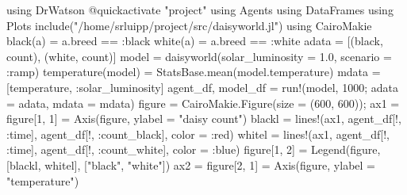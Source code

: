 \documentclass[
  english,
  russian,
  12pt,
  a4paper,
  DIV=11,
  numbers=noendperiod]{scrreprt}
\newenvironment{Shaded}{\begin{snugshade}}{\end{snugshade}}
\newcommand{\BuiltInTok}[1]{\textcolor[rgb]{0.00,0.23,0.31}{#1}}
\newcommand{\FloatTok}[1]{\textcolor[rgb]{0.68,0.00,0.00}{#1}}
\newcommand{\FunctionTok}[1]{\textcolor[rgb]{0.28,0.35,0.67}{#1}}
\newcommand{\ImportTok}[1]{\textcolor[rgb]{0.00,0.46,0.62}{#1}}
\newcommand{\NormalTok}[1]{\textcolor[rgb]{0.00,0.23,0.31}{#1}}
\newcommand{\OperatorTok}[1]{\textcolor[rgb]{0.37,0.37,0.37}{#1}}
\newcommand{\PreprocessorTok}[1]{\textcolor[rgb]{0.68,0.00,0.00}{#1}}
\newcommand{\StringTok}[1]{\textcolor[rgb]{0.13,0.47,0.30}{#1}}
\begin{document}
\begin{Shaded}
\begin{Highlighting}[]
\ImportTok{using} \BuiltInTok{DrWatson}
\PreprocessorTok{@quickactivate} \StringTok{"project"}
\ImportTok{using} \BuiltInTok{Agents}
\ImportTok{using} \BuiltInTok{DataFrames}
\ImportTok{using} \BuiltInTok{Plots}
\FunctionTok{include}\NormalTok{(}\StringTok{"/home/srluipp/project/src/daisyworld.jl"}\NormalTok{)}
\ImportTok{using} \BuiltInTok{CairoMakie}
\FunctionTok{black}\NormalTok{(a) }\OperatorTok{=}\NormalTok{ a.breed }\OperatorTok{==} \OperatorTok{:}\NormalTok{black}
\FunctionTok{white}\NormalTok{(a) }\OperatorTok{=}\NormalTok{ a.breed }\OperatorTok{==} \OperatorTok{:}\NormalTok{white}
\NormalTok{adata }\OperatorTok{=}\NormalTok{ [(black, count), (white, count)]}
\NormalTok{model }\OperatorTok{=} \FunctionTok{daisyworld}\NormalTok{(solar\_luminosity }\OperatorTok{=} \FloatTok{1.0}\NormalTok{, scenario }\OperatorTok{=} \OperatorTok{:}\NormalTok{ramp)}
\FunctionTok{temperature}\NormalTok{(model) }\OperatorTok{=}\NormalTok{ StatsBase.}\FunctionTok{mean}\NormalTok{(model.temperature)}
\NormalTok{mdata }\OperatorTok{=}\NormalTok{ [temperature, }\OperatorTok{:}\NormalTok{solar\_luminosity]}
\NormalTok{agent\_df, model\_df }\OperatorTok{=} \FunctionTok{run!}\NormalTok{(model, }\FloatTok{1000}\NormalTok{; adata }\OperatorTok{=}\NormalTok{ adata, mdata }\OperatorTok{=}\NormalTok{ mdata)}
\NormalTok{figure }\OperatorTok{=}\NormalTok{ CairoMakie.}\FunctionTok{Figure}\NormalTok{(size }\OperatorTok{=}\NormalTok{ (}\FloatTok{600}\NormalTok{, }\FloatTok{600}\NormalTok{));}
\NormalTok{ax1 }\OperatorTok{=}\NormalTok{ figure[}\FloatTok{1}\NormalTok{, }\FloatTok{1}\NormalTok{] }\OperatorTok{=} \FunctionTok{Axis}\NormalTok{(figure, ylabel }\OperatorTok{=} \StringTok{"daisy count"}\NormalTok{)}
\NormalTok{blackl }\OperatorTok{=} \FunctionTok{lines!}\NormalTok{(ax1, agent\_df[!, }\OperatorTok{:}\NormalTok{time], agent\_df[!, }\OperatorTok{:}\NormalTok{count\_black], color }\OperatorTok{=} \OperatorTok{:}\NormalTok{red)}
\NormalTok{whitel }\OperatorTok{=} \FunctionTok{lines!}\NormalTok{(ax1, agent\_df[!, }\OperatorTok{:}\NormalTok{time], agent\_df[!, }\OperatorTok{:}\NormalTok{count\_white], color }\OperatorTok{=} \OperatorTok{:}\NormalTok{blue)}
\NormalTok{figure[}\FloatTok{1}\NormalTok{, }\FloatTok{2}\NormalTok{] }\OperatorTok{=} \FunctionTok{Legend}\NormalTok{(figure, [blackl, whitel], [}\StringTok{"black"}\NormalTok{, }\StringTok{"white"}\NormalTok{])}
\NormalTok{ax2 }\OperatorTok{=}\NormalTok{ figure[}\FloatTok{2}\NormalTok{, }\FloatTok{1}\NormalTok{] }\OperatorTok{=} \FunctionTok{Axis}\NormalTok{(figure, ylabel }\OperatorTok{=} \StringTok{"temperature"}\NormalTok{)}

\end{Highlighting}
\end{Shaded}
\end{document}
